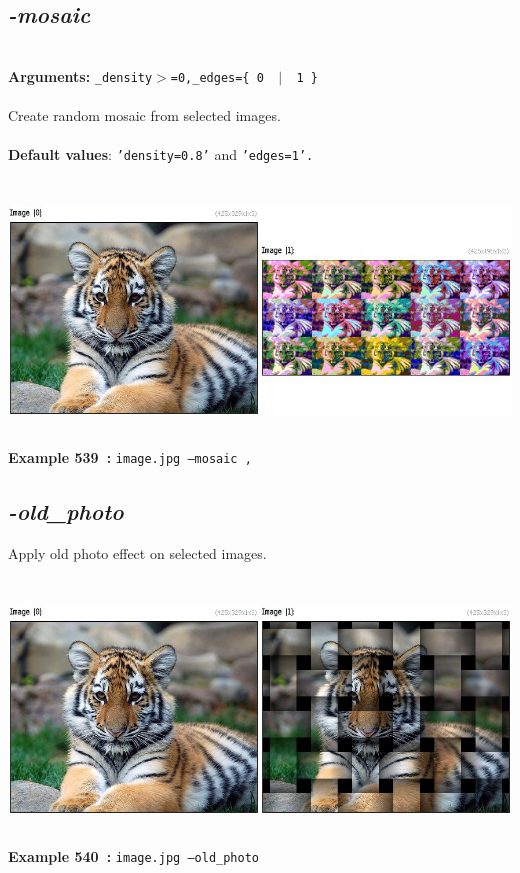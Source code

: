 \documentclass[a4paper,11pt,twoside]{book}
\begin{document}
\subsection{\emph{-mosaic} }\vspace*{-0.5em}
~\\\textbf{Arguments: } 
{\small \texttt{\_density$>$=0,\_edges=\{ 0 ~$|$~ 1 \}}}\\~\\
Create random mosaic from selected images.
~\\~\\\textbf{Default values}: {\small \texttt{'density=0.8'} and \texttt{'edges=1'.}}
\begin{center}\includegraphics[keepaspectratio=true,height=7cm,width=\textwidth]{img/gmic_def539.jpg}\\
{\footnotesize \textbf{Example 539~:} \texttt{image.jpg --mosaic ,}}
\end{center}

\subsection{\emph{-old\_photo} }\vspace*{-0.5em}
Apply old photo effect on selected images.
\begin{center}\includegraphics[keepaspectratio=true,height=7cm,width=\textwidth]{img/gmic_def540.jpg}\\
{\footnotesize \textbf{Example 540~:} \texttt{image.jpg --old\_photo}}
\end{center}
\end{document}

